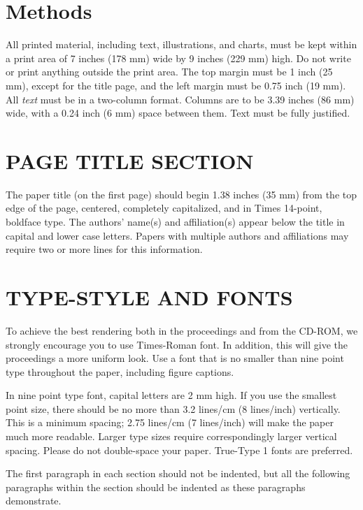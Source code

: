 \documentclass{article}
\begin{document}
\section{Methods}
\label{sec:Methods}

All printed material, including text, illustrations, and charts, must be kept
within a print area of 7 inches (178 mm) wide by 9 inches (229 mm) high. Do
not write or print anything outside the print area. The top margin must be 1
inch (25 mm), except for the title page, and the left margin must be 0.75 inch
(19 mm).  All {\it text} must be in a two-column format. Columns are to be 3.39
inches (86 mm) wide, with a 0.24 inch (6 mm) space between them. Text must be
fully justified.

\section{PAGE TITLE SECTION}
\label{sec:pagestyle}

The paper title (on the first page) should begin 1.38 inches (35 mm) from the
top edge of the page, centered, completely capitalized, and in Times 14-point,
boldface type.  The authors' name(s) and affiliation(s) appear below the title
in capital and lower case letters.  Papers with multiple authors and
affiliations may require two or more lines for this information.

\section{TYPE-STYLE AND FONTS}
\label{sec:typestyle}

To achieve the best rendering both in the proceedings and from the CD-ROM, we
strongly encourage you to use Times-Roman font.  In addition, this will give
the proceedings a more uniform look.  Use a font that is no smaller than nine
point type throughout the paper, including figure captions.

In nine point type font, capital letters are 2 mm high.  If you use the
smallest point size, there should be no more than 3.2 lines/cm (8 lines/inch)
vertically.  This is a minimum spacing; 2.75 lines/cm (7 lines/inch) will make
the paper much more readable.  Larger type sizes require correspondingly larger
vertical spacing.  Please do not double-space your paper.  True-Type 1 fonts
are preferred.

The first paragraph in each section should not be indented, but all the
following paragraphs within the section should be indented as these paragraphs
demonstrate.
\end{document}
